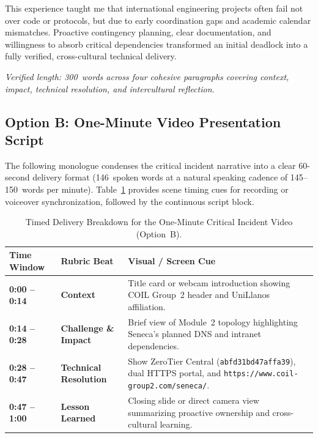 \begin{tcolorbox}
This experience taught me that international engineering projects often fail not over code or protocols, but due to early coordination gaps and academic calendar mismatches. Proactive contingency planning, clear documentation, and willingness to absorb critical dependencies transformed an initial deadlock into a fully verified, cross-cultural technical delivery.
\end{tcolorbox}

\noindent\textit{Verified length: 300~words across four cohesive paragraphs covering context, impact, technical resolution, and intercultural reflection.}

\subsection{Option B: One-Minute Video Presentation Script}

The following monologue condenses the critical incident narrative into a clear 60-second delivery format (146~spoken words at a natural speaking cadence of 145--150~words per minute). Table~\ref{tab:video_script_timing} provides scene timing cues for recording or voiceover synchronization, followed by the continuous script block.

\begin{table}[H]
\centering
\caption{Timed Delivery Breakdown for the One-Minute Critical Incident Video (Option~B).}
\label{tab:video_script_timing}
\small
\begin{tabularx}{\textwidth}{@{} >{\bfseries}l >{\bfseries}l >{\raggedright\arraybackslash}X @{}}
\toprule
\textbf{Time Window} & \textbf{Rubric Beat} & \textbf{Visual / Screen Cue} \\
\midrule
0:00 -- 0:14 & Context & Title card or webcam introduction showing COIL Group~2 header and UniLlanos affiliation. \\
0:14 -- 0:28 & Challenge \& Impact & Brief view of Module~2 topology highlighting Seneca's planned DNS and intranet dependencies. \\
0:28 -- 0:47 & Technical Resolution & Show ZeroTier Central (\texttt{abfd31bd47affa39}), dual HTTPS portal, and \texttt{https://www.coil-group2.com/seneca/}. \\
0:47 -- 1:00 & Lesson Learned & Closing slide or direct camera view summarizing proactive ownership and cross-cultural learning. \\
\bottomrule
\end{tabularx}
\end{table}

